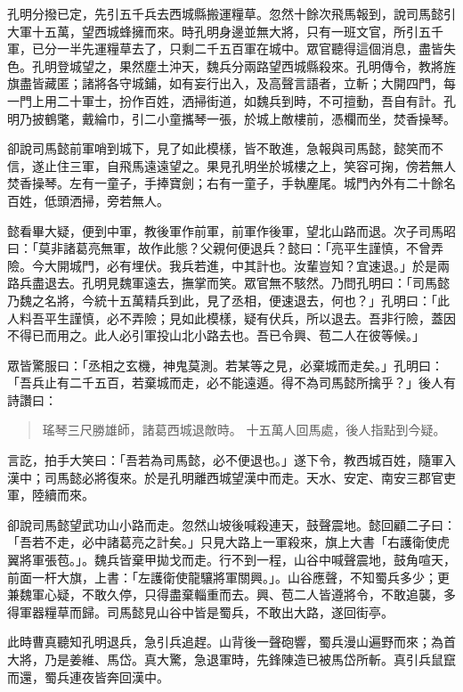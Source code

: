 孔明分撥已定，先引五千兵去西城縣搬運糧草。忽然十餘次飛馬報到，說司馬懿引大軍十五萬，望西城蜂擁而來。時孔明身邊並無大將，只有一班文官，所引五千軍，已分一半先運糧草去了，只剩二千五百軍在城中。眾官聽得這個消息，盡皆失色。孔明登城望之，果然塵土沖天，魏兵分兩路望西城縣殺來。孔明傳令，教將旌旗盡皆藏匿；諸將各守城鋪，如有妄行出入，及高聲言語者，立斬；大開四門，每一門上用二十軍士，扮作百姓，洒掃街道，如魏兵到時，不可擅動，吾自有計。孔明乃披鶴氅，戴綸巾，引二小童攜琴一張，於城上敵樓前，憑欄而坐，焚香操琴。

卻說司馬懿前軍哨到城下，見了如此模樣，皆不敢進，急報與司馬懿，懿笑而不信，遂止住三軍，自飛馬遠遠望之。果見孔明坐於城樓之上，笑容可掬，傍若無人焚香操琴。左有一童子，手捧寶劍；右有一童子，手執麈尾。城門內外有二十餘名百姓，低頭洒掃，旁若無人。

懿看畢大疑，便到中軍，教後軍作前軍，前軍作後軍，望北山路而退。次子司馬昭曰：「莫非諸葛亮無軍，故作此態？父親何便退兵？懿曰：「亮平生謹慎，不曾弄險。今大開城門，必有埋伏。我兵若進，中其計也。汝輩豈知？宜速退。」於是兩路兵盡退去。孔明見魏軍遠去，撫掌而笑。眾官無不駭然。乃問孔明曰：「司馬懿乃魏之名將，今統十五萬精兵到此，見了丞相，便速退去，何也？」孔明曰：「此人料吾平生謹慎，必不弄險；見如此模樣，疑有伏兵，所以退去。吾非行險，蓋因不得已而用之。此人必引軍投山北小路去也。吾已令興、苞二人在彼等候。」

眾皆驚服曰：「丞相之玄機，神鬼莫測。若某等之見，必棄城而走矣。」孔明曰：「吾兵止有二千五百，若棄城而走，必不能遠遁。得不為司馬懿所擒乎？」後人有詩讚曰：

\begin{quote}
瑤琴三尺勝雄師，諸葛西城退敵時。
十五萬人回馬處，後人指點到今疑。
\end{quote}

言訖，拍手大笑曰：「吾若為司馬懿，必不便退也。」遂下令，教西城百姓，隨軍入漢中；司馬懿必將復來。於是孔明離西城望漢中而走。天水、安定、南安三郡官吏軍，陸續而來。

卻說司馬懿望武功山小路而走。忽然山坡後喊殺連天，鼓聲震地。懿回顧二子曰：「吾若不走，必中諸葛亮之計矣。」只見大路上一軍殺來，旗上大書「右護衛使虎翼將軍張苞。」。魏兵皆棄甲拋戈而走。行不到一程，山谷中喊聲震地，鼓角喧天，前面一杆大旗，上書：「左護衛使龍驤將軍關興。」。山谷應聲，不知蜀兵多少；更兼魏軍心疑，不敢久停，只得盡棄輜重而去。興、苞二人皆遵將令，不敢追襲，多得軍器糧草而歸。司馬懿見山谷中皆是蜀兵，不敢出大路，遂回街亭。

此時曹真聽知孔明退兵，急引兵追趕。山背後一聲砲響，蜀兵漫山遍野而來；為首大將，乃是姜維、馬岱。真大驚，急退軍時，先鋒陳造已被馬岱所斬。真引兵鼠竄而還，蜀兵連夜皆奔回漢中。

